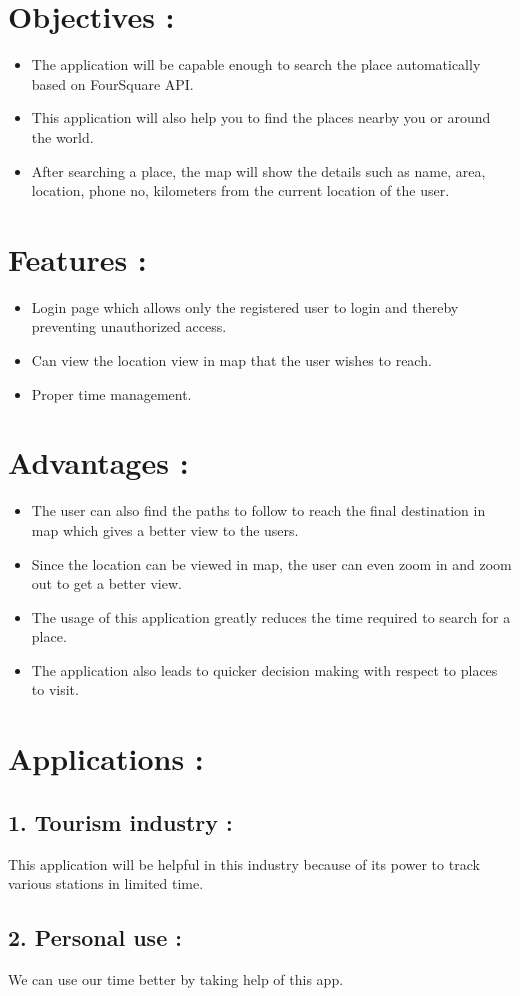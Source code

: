 \documentclass{article}
\begin{document}
  \section{Objectives :}
   \begin{itemize}
  \item The application will be capable enough to search the place automatically based on FourSquare API.
  \item This application will also help you to find the places nearby you or around the world.
  \item After searching a place, the map will show the details such as name, area, location, phone no, kilometers from the current location of the user.
  \end{itemize} \hfill \break
  
    
   \section{Features :}
   \begin{itemize}
   \item Login page which allows only the registered user to login and thereby preventing unauthorized access.
   \item Can view the location view in map that the user wishes to reach.
   \item Proper time management.
   \end{itemize} \hfill \break
  
  \section{Advantages :}
  \begin{itemize}
  \item The user can also find the paths to follow to reach the final destination in map which gives a better view to the users.
  \item Since the location can be viewed in map, the user can even zoom in and zoom out to get a better view.
  \item The usage of this application greatly reduces the time required to search for a place.
  \item The application also leads to quicker decision making with respect to places to visit.
  \end{itemize} \hfill \break
  
  
  \section{Applications :}
  \subsection{ 1. Tourism industry :}
  This application will be helpful in this industry because of its power to track various stations in limited time.
  \subsection{ 2. Personal use :}
  We can use our time better by taking help of this app.
  
  
\end{document}

